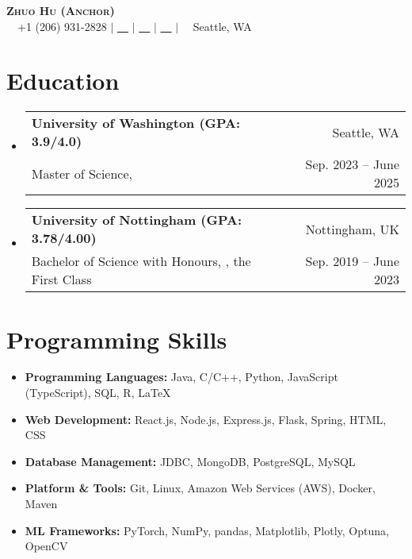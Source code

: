 \documentclass[letterpaper,10pt]{article}
\makeatletter
\newcommand{\link}[1]{\color{myBlue}{#1}}
\newcommand{\resumeSubheading}[4]{
  \vspace{-2pt}\item
    \begin{tabular*}{0.97\textwidth}[t]{l@{\extracolsep{\fill}}r}
      \textbf{#1} & #2 \\
      \small#3 & \small #4 \\
    \end{tabular*}\vspace{-7pt}
}
\newcommand{\resumeSubHeadingListStart}{\begin{itemize}[leftmargin=0.15in, label={}]}
\newcommand{\resumeSubHeadingListEnd}{\end{itemize}}
\makeatother
\begin{document}
\begin{center}
  \textbf{\Huge \scshape Zhuo Hu (Anchor)} \\ \vspace{1pt}
  \small \faMobile \ \ +1 (206) 931-2828 $|$ \href{mailto:uwzhuohu@uw.edu}{\faEnvelope \ \ \link{uwzhuohu@uw.edu}} $|$
  \href{https://linkedin.com/in/zhuo-hu}{\faLinkedin \ \ \link{LinkedIn}} $|$
  \href{https://github.com/Anchor-ZhuoHU}{\faGithub \ \ \link{GitHub}} $|$
  \faBuilding \ \ Seattle, WA
\end{center}
\section{Education}
\resumeSubHeadingListStart
\resumeSubheading
{University of Washington (GPA: 3.9/4.0)}{Seattle, WA}
{Master of Science, \href{https://www.ece.uw.edu/}{\link{Electrical and Computer Engineering}}}{Sep. 2023 -- June 2025}
\resumeSubheading
{University of Nottingham (GPA: 3.78/4.00)}{Nottingham, UK}
{Bachelor of Science with Honours, \href{https://www.nottingham.ac.uk/mathematics/}{\link{Mathematics with Applied Mathematics}}, the First Class}{Sep. 2019 -- June 2023}
\resumeSubHeadingListEnd
\section{Programming Skills}
\resumeSubHeadingListStart
\setlength\itemsep{0em}
\item \textbf{Programming Languages:} Java, C/C++, Python, JavaScript (TypeScript), SQL, R, \LaTeX
\item \textbf{Web Development:} React.js, Node.js, Express.js, Flask, Spring, HTML, CSS
\item \textbf{Database Management:} JDBC, MongoDB, PostgreSQL, MySQL
\item \textbf{Platform \& Tools:} Git, Linux, Amazon Web Services (AWS), Docker, Maven
\item \textbf{ML Frameworks:} PyTorch, NumPy, pandas, Matplotlib, Plotly, Optuna, OpenCV
\vspace{-8pt}
\resumeSubHeadingListEnd
\end{document}

